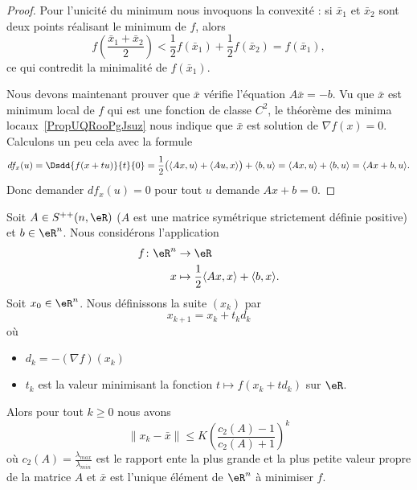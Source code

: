 \begin{proof}
    Pour l'unicité du minimum nous invoquons la convexité : si \( \bar x_1\) et \( \bar x_2\) sont deux points réalisant le minimum de \( f\), alors
    \begin{equation}
        f\left( \frac{ \bar x_1+\bar x_2 }{2} \right)<\frac{ 1 }{2}f(\bar x_1)+\frac{ 1 }{2}f(\bar x_2)=f(\bar x_1),
    \end{equation}
    ce qui contredit la minimalité de \( f(\bar x_1)\).

    Nous devons maintenant prouver que \( \bar x\) vérifie l'équation \( A\bar x=-b\). Vu que \( \bar x\) est minimum local de \( f\) qui est une fonction de classe \( C^2\), le théorème des minima locaux~\ref{PropUQRooPgJsuz} nous indique que \( \bar x\) est solution de \( \nabla f(x)=0\). Calculons un peu cela avec la formule
    \begin{equation}
        df_x(u)=\Dsdd{ f(x+tu) }{t}{0}=\frac{ 1 }{2}\big( \langle Ax, u\rangle +\langle Au, x\rangle  \big)+\langle b, u\rangle =\langle Ax, u\rangle +\langle b, u\rangle =\langle Ax+b, u\rangle .
    \end{equation}
    Donc demander \( df_x(u)=0\) pour tout \( u\) demande \( Ax+b=0\).
\end{proof}

\begin{proposition} \label{PropSOOooGoMOxG}
    Soit \( A\in S^{++}(n,\eR)\) (\( A\) est une matrice symétrique strictement définie positive) et \( b\in \eR^n\). Nous considérons l'application
    \begin{equation}
        \begin{aligned}
            f\colon \eR^n&\to \eR \\
            x&\mapsto \frac{ 1 }{2}\langle Ax, x\rangle +\langle b, x\rangle .
        \end{aligned}
    \end{equation}
    Soit \( x_0\in \eR^n\). Nous définissons la suite \( (x_k)\) par
    \begin{equation}
        x_{k+1}=x_k+t_kd_k
    \end{equation}
    où
    \begin{itemize}
        \item
    \( d_k=-(\nabla f)(x_k)\)
\item
    \( t_k\) est la valeur minimisant la fonction \( t\mapsto f(x_k+td_k)\) sur \( \eR\).
    \end{itemize}

    Alors pour tout \( k\geq 0\) nous avons
    \begin{equation}
        \| x_k-\bar x \|\leq K \left( \frac{ c_2(A)-1 }{ c_2(A)+1 } \right)^k
    \end{equation}
    où \( c_2(A)=\frac{ \lambda_{max} }{ \lambda_{min} }\) est le rapport ente la plus grande et la plus petite valeur propre de la matrice \( A\) et \( \bar x\) est l'unique élément de \( \eR^n\) à minimiser \( f\).
\end{proposition}

